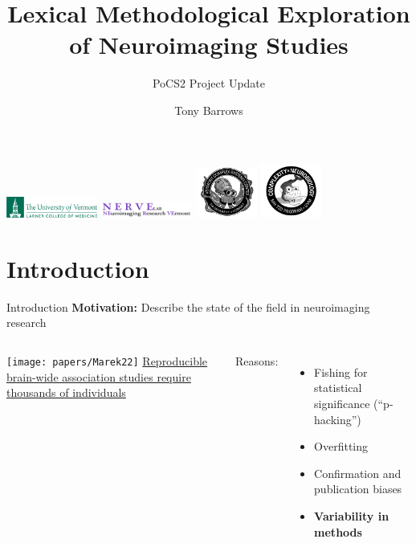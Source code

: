 \documentclass[aspectratio=169]{beamer}
\title[Brainwise Wordsearch]{Lexical Methodological Exploration of Neuroimaging Studies}
\subtitle[]{PoCS2 Project Update}
\author[Tony Barrows]{Tony Barrows}
\begin{document}
	
	\begin{frame}
		\maketitle
		
		\centering
		\includegraphics[width=3cm]{larner}
		\includegraphics[width=3cm]{nerve}
		\includegraphics[width=2cm]{complexsystems}
		\includegraphics[width=2cm]{complexbrain}
	\end{frame}
	

\section{Introduction}

\begin{frame}{Introduction}
	\textbf{Motivation:} Describe the state of the field in neuroimaging research
	\vspace{5mm}
	\begin{columns}
			\texttt{[image: papers/Marek22]}
			\href{https://www.nature.com/articles/s41586-022-04492-9}{Reproducible brain-wide association studies require thousands of individuals \cite{MarekEtAl2022}}
			
			Reasons:
			\begin{itemize}
					\item Fishing for statistical significance (``p-hacking'') \cite{Nuzzo}
					\item Overfitting \cite{Hawkins2004}
					\item Confirmation and publication biases \cite{Bishop2020}
					\item \textbf{Variability in methods \cite{Botvinik-NezerEtAl2020}} 
				\end{itemize}
		\end{columns}
	
	
\end{frame}
\end{document}
